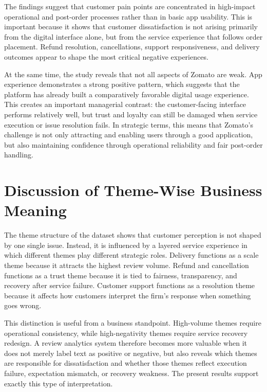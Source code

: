 The findings suggest that customer pain points are concentrated in high-impact operational and post-order processes rather than in basic app usability. This is important because it shows that customer dissatisfaction is not arising primarily from the digital interface alone, but from the service experience that follows order placement. Refund resolution, cancellations, support responsiveness, and delivery outcomes appear to shape the most critical negative experiences.

At the same time, the study reveals that not all aspects of Zomato are weak. App experience demonstrates a strong positive pattern, which suggests that the platform has already built a comparatively favorable digital usage experience. This creates an important managerial contrast: the customer-facing interface performs relatively well, but trust and loyalty can still be damaged when service execution or issue resolution fails. In strategic terms, this means that Zomato's challenge is not only attracting and enabling users through a good application, but also maintaining confidence through operational reliability and fair post-order handling.

\section{Discussion of Theme-Wise Business Meaning}

The theme structure of the dataset shows that customer perception is not shaped by one single issue. Instead, it is influenced by a layered service experience in which different themes play different strategic roles. Delivery functions as a scale theme because it attracts the highest review volume. Refund and cancellation functions as a trust theme because it is tied to fairness, transparency, and recovery after service failure. Customer support functions as a resolution theme because it affects how customers interpret the firm's response when something goes wrong.

This distinction is useful from a business standpoint. High-volume themes require operational consistency, while high-negativity themes require service recovery redesign. A review analytics system therefore becomes more valuable when it does not merely label text as positive or negative, but also reveals which themes are responsible for dissatisfaction and whether those themes reflect execution failure, expectation mismatch, or recovery weakness. The present results support exactly this type of interpretation.

